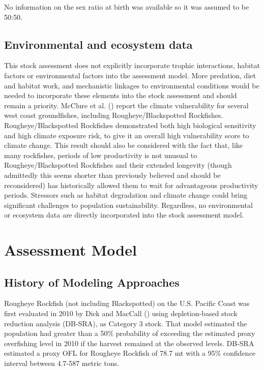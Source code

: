 \documentclass[
]{scrartcl}
\begin{document}
No information on the sex ratio at birth was available so it was assumed
to be 50:50.

\subsection{Environmental and ecosystem
data}\label{environmental-and-ecosystem-data}

This stock assessment does not explicitly incorporate trophic
interactions, habitat factors or environmental factors into the
assessment model. More predation, diet and habitat work, and mechanistic
linkages to environmental conditions would be needed to incorporate
these elements into the stock assessment and should remain a priority.
McClure et al. () report the
climate vulnerability for several west coast groundfishes, including
Rougheye/Blackspotted Rockfishes. Rougheye/Blackspotted Rockfishes
demonstrated both high biological sensitivity and high climate exposure
risk, to give it an overall high vulnerability score to climate change.
This result should also be considered with the fact that, like many
rockfishes, periods of low productivity is not unusual to
Rougheye/Blackspotted Rockfishes and their extended longevity (though
admittedly this seems shorter than previously believed and should be
reconsidered) has historically allowed them to wait for advantageous
productivity periods. Stressors such as habitat degradation and climate
change could bring significant challenges to population sustainability.
Regardless, no environmental or ecosystem data are directly incorporated
into the stock assessment model.

\newpage{}

\section{Assessment Model}\label{assessment-model}

\subsection{History of Modeling
Approaches}\label{history-of-modeling-approaches}

Rougheye Rockfish (not including Blackspotted) on the U.S. Pacific Coast
was first evaluated in 2010 by Dick and MacCall
() using depletion-based stock
reduction analysis (DB-SRA), as Category 3 stock. That model estimated
the population had greater than a 50\% probability of exceeding the
estimated proxy overfishing level in 2010 if the harvest remained at the
observed levels. DB-SRA estimated a proxy OFL for Rougheye Rockfish of
78.7 mt with a 95\% confidence interval between 4.7-587 metric tons.
\end{document}
